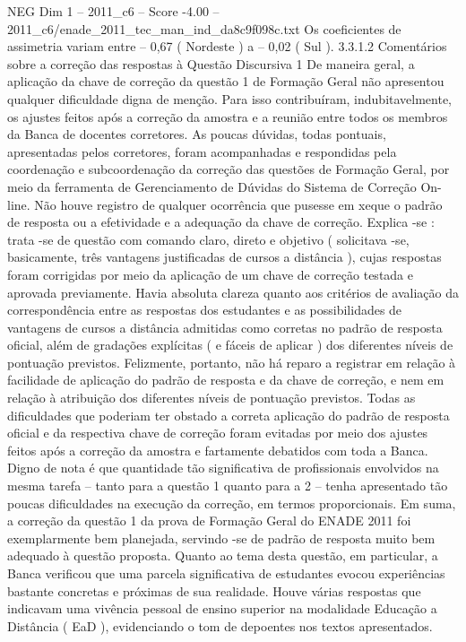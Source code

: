 \begin{textsample}{NEG Dim 1 – 2011\_c6 – Score -4.00 – 2011\_c6/enade\_2011\_tec\_man\_ind\_da8c9f098c.txt}
Os coeficientes de assimetria variam entre – 0,67 ( Nordeste ) a – 0,02 ( Sul ). 3.3.1.2 Comentários sobre a correção das respostas à Questão Discursiva 1 De maneira geral, a aplicação da chave de correção da questão 1 de Formação Geral não apresentou qualquer dificuldade digna de menção.
Para isso contribuíram, indubitavelmente, os ajustes feitos após a correção da amostra e a reunião entre todos os membros da Banca de docentes corretores.
As poucas dúvidas, todas pontuais, apresentadas pelos corretores, foram acompanhadas e respondidas pela coordenação e subcoordenação da correção das questões de Formação Geral, por meio da ferramenta de Gerenciamento de Dúvidas do Sistema de Correção On-line.
Não houve registro de qualquer ocorrência que pusesse em xeque o padrão de resposta ou a efetividade e a adequação da chave de correção.
Explica -se : trata -se de questão com comando claro, direto e objetivo ( solicitava -se, basicamente, três vantagens justificadas de cursos a distância ), cujas respostas foram corrigidas por meio da aplicação de um chave de correção testada e aprovada previamente.
Havia absoluta clareza quanto aos critérios de avaliação da correspondência entre as respostas dos estudantes e as possibilidades de vantagens de cursos a distância admitidas como corretas no padrão de resposta oficial, além de gradações explícitas ( e fáceis de aplicar ) dos diferentes níveis de pontuação previstos.
Felizmente, portanto, não há reparo a registrar em relação à facilidade de aplicação do padrão de resposta e da chave de correção, e nem em relação à atribuição dos diferentes níveis de pontuação previstos.
Todas as dificuldades que poderiam ter obstado a correta aplicação do padrão de resposta oficial e da respectiva chave de correção foram evitadas por meio dos ajustes feitos após a correção da amostra e fartamente debatidos com toda a Banca.
Digno de nota é que quantidade tão significativa de profissionais envolvidos na mesma tarefa – tanto para a questão 1 quanto para a 2 – tenha apresentado tão poucas dificuldades na execução da correção, em termos proporcionais.
Em suma, a correção da questão 1 da prova de Formação Geral do ENADE 2011 foi exemplarmente bem planejada, servindo -se de padrão de resposta muito bem adequado à questão proposta.
Quanto ao tema desta questão, em particular, a Banca verificou que uma parcela significativa de estudantes evocou experiências bastante concretas e próximas de sua realidade.
Houve várias respostas que indicavam uma vivência pessoal de ensino superior na modalidade Educação a Distância ( EaD ), evidenciando o tom de depoentes nos textos apresentados.

\end{textsample}
